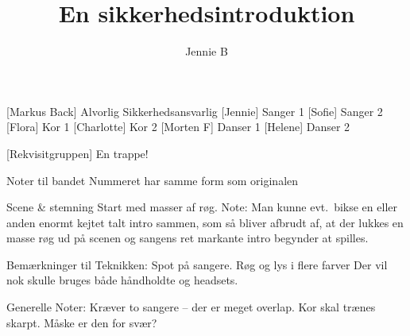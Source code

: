 \documentclass[a4paper,11pt]{article}
\title{En sikkerhedsintroduktion}
\author{Jennie B}
\begin{document}
\maketitle

\begin{roles}
  
  [Markus Back] Alvorlig Sikkerhedsansvarlig
  [Jennie] Sanger 1
    [Sofie] Sanger 2
    [Flora] Kor 1
    [Charlotte] Kor 2
    [Morten F] Danser 1
    [Helene] Danser 2
\end{roles}

\begin{props}
    [Rekvisitgruppen] En trappe!
\end{props}


\scene

Noter til bandet
Nummeret har samme form som originalen

Scene \& stemning
Start med masser af røg.
Note: Man kunne evt.\ bikse en eller anden enormt kejtet talt intro sammen, som så bliver afbrudt af, at der lukkes en masse røg ud på scenen og sangens ret markante intro begynder at spilles.

Bemærkninger til Teknikken:
Spot på sangere.
Røg og lys i flere farver
Der vil nok skulle bruges både håndholdte og headsets.

Generelle Noter:
Kræver to sangere -- der er meget overlap.
Kor skal trænes skarpt.
Måske er den for svær?
\end{document}

